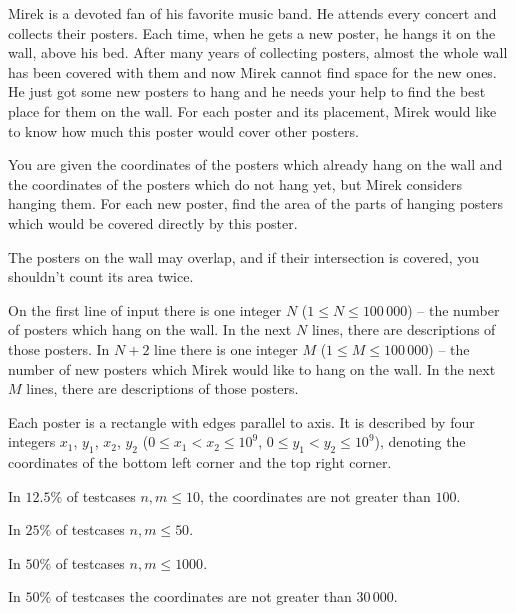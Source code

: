 

Mirek is a devoted fan of his favorite music band.
He attends every concert and collects their posters.
Each time, when he gets a new poster, he hangs it on the wall, above his bed.
After many years of collecting posters, almost the whole wall has been covered with them
	and now Mirek cannot find space for the new ones.
He just got some new posters to hang and he needs your help to find the best place for them on the wall.
For each poster and its placement, Mirek would like to know how much this poster would cover other posters.


You are given the coordinates of the posters which already hang on the wall
	and the coordinates of the posters which do not hang yet, but Mirek considers hanging them.
For each new poster, find the area of the parts of hanging posters which would be covered directly by this poster.

The posters on the wall may overlap, and if their intersection is covered, you shouldn't count its area twice.


On the first line of input there is one integer $N$ ($1 \le N \le 100\,000$)
	-- the number of posters which hang on the wall.
In the next $N$ lines, there are descriptions of those posters.
In $N+2$ line there is one integer $M$ ($1 \le M \le 100\,000$)
	-- the number of new posters which Mirek would like to hang on the wall.
In the next $M$ lines, there are descriptions of those posters.

Each poster is a rectangle with edges parallel to axis.
It is described by four integers $x_1$, $y_1$, $x_2$, $y_2$
	($0 \le x_1 < x_2 \le 10^9$, $0 \le y_1 < y_2 \le 10^9$),
	denoting the coordinates of the bottom left corner and the top right corner.

In $12.5\%$ of testcases $n, m \le 10$, the coordinates are not greater than $100$.

In $25\%$ of testcases $n, m \le 50$.

In $50\%$ of testcases $n, m \le 1000$.

In $50\%$ of testcases the coordinates are not greater than $30\,000$.


